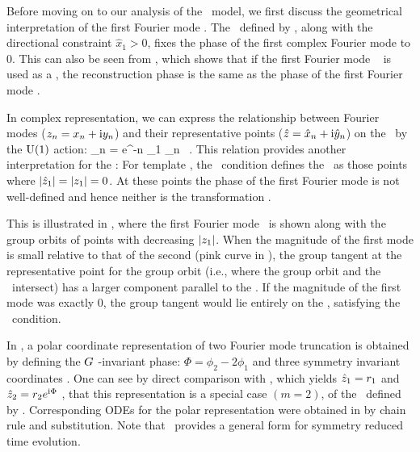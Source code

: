 \documentclass[aip,cha,
reprint,
secnumarabic,
nofootinbib, tightenlines,
nobibnotes, showkeys, showpacs,
superscriptaddress,
]{revtex4-1}
\begin{document}
Before moving on to our analysis of the \twomode\ model, we first 
discuss the geometrical interpretation of the first Fourier mode 
\slice. The \slice\ defined by , along with 
the directional constraint $\hat{x}_1 > 0$, fixes the phase of the 
first complex Fourier mode to $0$. This can also be seen from 
, which shows that if the first Fourier mode 
\slice\  is used as a \template, the 
reconstruction phase is the same as the phase of the first Fourier 
mode . 

In complex representation, we can express the relationship between 
Fourier modes ($z_n = x_n + \mathrm{i} y_n$) and their representative 
points ($\hat{z} = \hat{x}_n +  \mathrm{i} \hat{y}_n$) on the 
\slicePlane\ by the $\textrm{U}(1)$ action:
\beq
	\sspRedC_n = e^{-\ii n \phi_1} \sspC_n \, . 
This relation provides another interpretation for the \sliceBord:
For template , the \sliceBord\ condition 
 defines the \sliceBord\ as those points 
where $|\hat{z}_1| = |z_1| = 0$. At these points the phase of 
the first Fourier mode is not well-defined and hence neither is 
the transformation .

This is illustrated in , where the 
first Fourier mode \slicePlane\ is shown along with the group 
orbits of points with decreasing $|z_1|$. When the magnitude 
of the first mode is small relative to that of the second (pink 
curve in ), the group tangent at the 
representative point for the group orbit (i.e., where the group 
orbit and the \slicePlane\ intersect) has a larger component 
parallel to the \slicePlane. If the magnitude of the first mode 
was exactly $0$, the group tangent would lie entirely on the 
\slicePlane , satisfying the \sliceBord\ condition.

In , a polar coordinate representation of two 
Fourier mode truncation is obtained by defining the $G$
-invariant phase: $\Phi = \phi_2 - 2 \phi_1$ and three symmetry 
invariant coordinates . 
One can see by direct comparison with , 
which yields $\hat{z}_1 = r_1$ and $\hat{z}_2 = r_2 e^{\mathrm{i} \Phi}$
, that this representation is a special case $(m=2)$, of the 
\slice\ defined by . Corresponding ODEs for 
the polar representation were obtained in  by  
chain rule and substitution. Note that \mslices\ provides a 
general form  for symmetry reduced time 
evolution.
\end{document}
